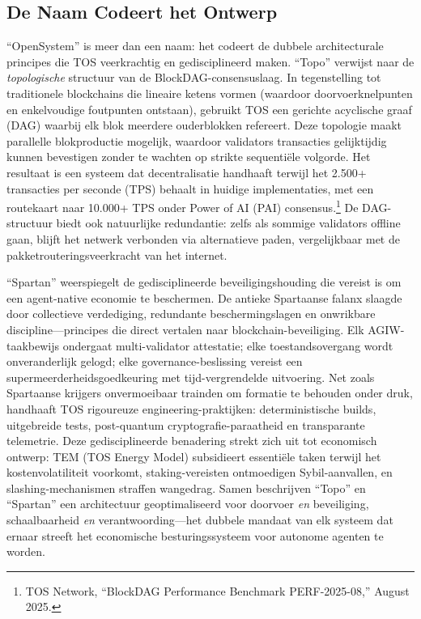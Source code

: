\documentclass[11pt]{article}
\begin{document}
\subsection{De Naam Codeert het Ontwerp}
``OpenSystem'' is meer dan een naam: het codeert de dubbele architecturale principes die TOS veerkrachtig en gedisciplineerd maken. ``Topo'' verwijst naar de \emph{topologische} structuur van de BlockDAG-consensuslaag. In tegenstelling tot traditionele blockchains die lineaire ketens vormen (waardoor doorvoerknelpunten en enkelvoudige foutpunten ontstaan), gebruikt TOS een gerichte acyclische graaf (DAG) waarbij elk blok meerdere ouderblokken refereert. Deze topologie maakt parallelle blokproductie mogelijk, waardoor validators transacties gelijktijdig kunnen bevestigen zonder te wachten op strikte sequentiële volgorde. Het resultaat is een systeem dat decentralisatie handhaaft terwijl het 2.500+ transacties per seconde (TPS) behaalt in huidige implementaties, met een routekaart naar 10.000+ TPS onder Power of AI (PAI) consensus.\footnote{TOS Network, ``BlockDAG Performance Benchmark PERF-2025-08,'' August 2025.} De DAG-structuur biedt ook natuurlijke redundantie: zelfs als sommige validators offline gaan, blijft het netwerk verbonden via alternatieve paden, vergelijkbaar met de pakketrouteringsveerkracht van het internet.

``Spartan'' weerspiegelt de gedisciplineerde beveiligingshouding die vereist is om een agent-native economie te beschermen. De antieke Spartaanse falanx slaagde door collectieve verdediging, redundante beschermingslagen en onwrikbare discipline---principes die direct vertalen naar blockchain-beveiliging. Elk AGIW-taakbewijs ondergaat multi-validator attestatie; elke toestandsovergang wordt onveranderlijk gelogd; elke governance-beslissing vereist een supermeerderheidsgoedkeuring met tijd-vergrendelde uitvoering. Net zoals Spartaanse krijgers onvermoeibaar trainden om formatie te behouden onder druk, handhaaft TOS rigoureuze engineering-praktijken: deterministische builds, uitgebreide tests, post-quantum cryptografie-paraatheid en transparante telemetrie. Deze gedisciplineerde benadering strekt zich uit tot economisch ontwerp: TEM (TOS Energy Model) subsidieert essentiële taken terwijl het kostenvolatiliteit voorkomt, staking-vereisten ontmoedigen Sybil-aanvallen, en slashing-mechanismen straffen wangedrag. Samen beschrijven ``Topo'' en ``Spartan'' een architectuur geoptimaliseerd voor doorvoer \emph{en} beveiliging, schaalbaarheid \emph{en} verantwoording---het dubbele mandaat van elk systeem dat ernaar streeft het economische besturingssysteem voor autonome agenten te worden.
\end{document}
